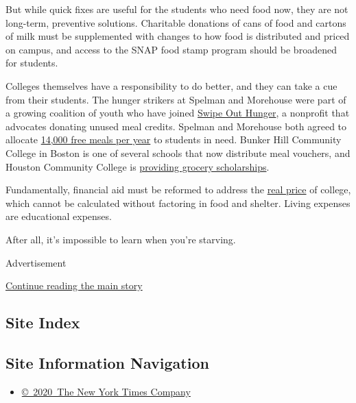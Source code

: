 But while quick fixes are useful for the students who need food now,
they are not long-term, preventive solutions. Charitable donations of
cans of food and cartons of milk must be supplemented with changes to
how food is distributed and priced on campus, and access to the SNAP
food stamp program should be broadened for students.

Colleges themselves have a responsibility to do better, and they can
take a cue from their students. The hunger strikers at Spelman and
Morehouse were part of a growing coalition of youth who have joined
\href{http://www.swipehunger.org/}{Swipe Out Hunger}, a nonprofit that
advocates donating unused meal credits. Spelman and Morehouse both
agreed to allocate
\href{https://thegrio.com/2017/11/11/morehouse-spelman-students-hunger-strike-ends-free-meals-campus/}{14,000
free meals per year} to students in need. Bunker Hill Community College
in Boston is one of several schools that now distribute meal vouchers,
and Houston Community College is
\href{http://wihopelab.com/publications/Addressing-Basic-Needs-Security-in-Higher-Education.pdf}{providing
grocery scholarships}.

Fundamentally, financial aid must be reformed to address the
\href{https://tcf.org/content/report/the-real-price-of-college/}{real
price} of college, which cannot be calculated without factoring in food
and shelter. Living expenses are educational expenses.

After all, it's impossible to learn when you're starving.

Advertisement

\protect\hyperlink{after-bottom}{Continue reading the main story}

\hypertarget{site-index}{%
\subsection{Site Index}\label{site-index}}

\hypertarget{site-information-navigation}{%
\subsection{Site Information
Navigation}\label{site-information-navigation}}

\begin{itemize}
\tightlist
\item
  \href{https://help.nytimes.com/hc/en-us/articles/115014792127-Copyright-notice}{©~2020~The
  New York Times Company}
\end{itemize}

